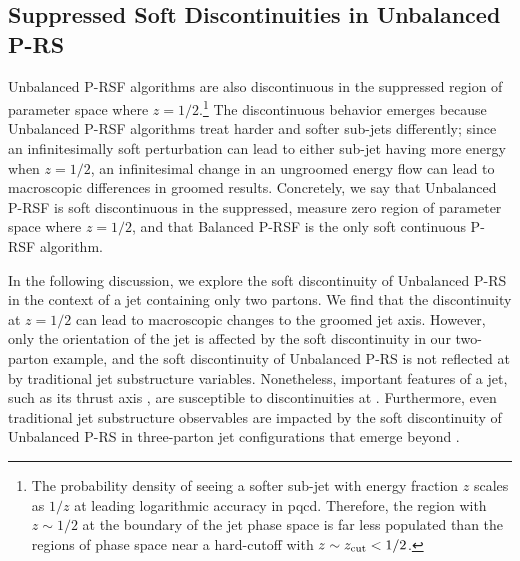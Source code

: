 
\subsection{Suppressed Soft Discontinuities in Unbalanced P-RS}
\label{sec:rsf_discont}

Unbalanced P-RSF algorithms are also discontinuous in the suppressed region of parameter space where \(z = 1/2\).\footnote{
The probability density of seeing a softer sub-jet with energy fraction \(z\) scales as \(1/z\) at leading logarithmic accuracy in \gls{pqcd}.
%
Therefore, the region with \(z \sim 1/2\) at the boundary of the jet phase space is far less populated than the regions of phase space near a hard-cutoff with \(z \sim z_{\rm cut} < 1/2\).
}
%
The discontinuous behavior emerges because Unbalanced P-RSF algorithms treat harder and softer sub-jets differently;
%
since an infinitesimally soft perturbation can lead to either sub-jet having more energy when \(z = 1/2\), an infinitesimal change in an ungroomed energy flow can lead to macroscopic differences in groomed results.
%
Concretely, we say that Unbalanced P-RSF is soft discontinuous in the suppressed, measure zero region of parameter space where \(z = 1/2\), and that Balanced P-RSF is the only soft continuous P-RSF algorithm.

In the following discussion, we explore the soft discontinuity of Unbalanced P-RS in the context of a jet containing only two partons.
%
We find that the discontinuity at \(z = 1/2\) can lead to macroscopic changes to the groomed jet axis.
%
However, only the orientation of the jet is affected by the soft discontinuity in our two-parton example, and the soft discontinuity of Unbalanced P-RS is not reflected at  by traditional jet substructure variables.
%
Nonetheless, important features of a jet, such as its thrust axis \cite{Brandt:1964sa,Farhi:1977sg}, are susceptible to discontinuities at .
%
Furthermore, even traditional jet substructure observables are impacted by the soft discontinuity of Unbalanced P-RS in three-parton jet configurations that emerge beyond .



